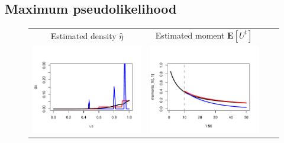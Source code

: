 \documentclass{article}
\newcommand{\E}{\textbf{E}}
\begin{document}
\subsection{Maximum pseudolikelihood}

\begin{figure}
\centering
\begin{tabular}{ccrl}
Estimated density $\hat{\eta}$ &Estimated moment $\E[U^t]$ & \\
\multirow{5}{*}{\includegraphics[scale = 0.5, clip=true, trim=0.2in 0.6in 0 0.7in]{../extrapolation/gu_est.pdf}} &
\multirow{5}{*}{\includegraphics[scale = 0.5, clip=true, trim=0.2in 0.6in 0 0.7in]{../extrapolation/gu_est_moments.pdf}} & & \\

\end{tabular}
\end{figure}
\end{document}
